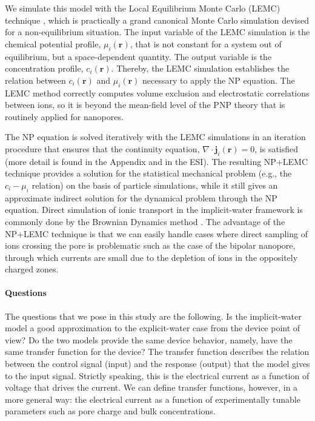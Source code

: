\documentclass[fleqn,10pt]{SelfArx} %
\begin{document}
We simulate this model with the Local Equilibrium Monte Carlo (LEMC) technique \cite{boda-jctc-8-824-2012,boda-jml-189-100-2014,boda-arcc-2014}, which is practically a grand canonical Monte Carlo simulation devised for a non-equilibrium situation. 
The input variable of the LEMC simulation is the chemical potential profile, $\mu_{i}(\mathbf{r})$, that is not constant for a system out of equilibrium, but a space-dependent quantity.
The output variable is the concentration profile, $c_{i}(\mathbf{r})$. 
Thereby, the LEMC simulation establishes the relation between $c_{i}(\mathbf{r})$ and $\mu_{i}(\mathbf{r})$ necessary to apply the NP equation.
The LEMC method correctly computes volume exclusion and electrostatic correlations between ions, so it is beyond the mean-field level of the PNP theory that is routinely applied for nanopores.

The NP equation is solved iteratively with the LEMC simulations in an iteration procedure that ensures that the continuity equation, $\nabla \cdot \mathbf{j}_{i}(\mathbf{r})=0$, is satisfied  (more detail is found in the Appendix and in the ESI).
The resulting NP+LEMC technique provides a solution for the statistical mechanical problem (e.g., the $c_{i}-\mu_{i}$ relation) on the basis of particle simulations, while it still gives an approximate indirect solution for the dynamical problem through the NP equation.
Direct simulation of ionic transport in the implicit-water framework is commonly done by the Brownian Dynamics method \cite{chung-bj-77-2517-1999,im_bj_2000,berti-jctc-10-2911-2014}.
The advantage of the NP+LEMC technique is that we can easily handle cases where direct sampling of ions crossing the pore is problematic such as the case of the bipolar nanopore, through which currents are small due to the depletion of ions in the oppositely charged zones.

\paragraph*{Questions}

The questions that we pose in this study are the following.
Is the implicit-water model a good approximation to the explicit-water case from the device point of view?
Do the two models provide the same device behavior, namely, have the same transfer function for the device?
The transfer function describes the relation between the control signal (input) and the response (output) that the model gives to the input signal.
Strictly speaking, this is the electrical current as a function of voltage that drives the current. 
We can define transfer functions, however, in a more general way: the electrical current as a function of experimentally tunable parameters such as pore charge and bulk concentrations.
\end{document}
